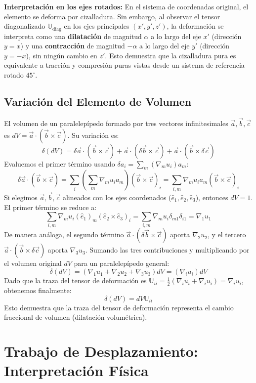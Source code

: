 \textbf{Interpretación en los ejes rotados:}
En el sistema de coordenadas original, el elemento se deforma por cizalladura. Sin embargo, al observar el tensor diagonalizado $\mathbb{U}_{\text{diag}}$ en los ejes principales $(x', y', z')$, la deformación se interpreta como una \textbf{dilatación} de magnitud $\alpha$ a lo largo del eje $x'$ (dirección $y=x$) y una \textbf{contracción} de magnitud $-\alpha$ a lo largo del eje $y'$ (dirección $y=-x$), sin ningún cambio en $z'$. Esto demuestra que la cizalladura pura es equivalente a tracción y compresión puras vistas desde un sistema de referencia rotado $45^\circ$.

\subsection{Variación del Elemento de Volumen}

El volumen de un paralelepípedo formado por tres vectores infinitesimales $\vec{a}, \vec{b}, \vec{c}$ es $dV = \vec{a} \cdot (\vec{b} \times \vec{c})$. Su variación es:
$$ \delta(dV) = \delta\vec{a} \cdot (\vec{b} \times \vec{c}) + \vec{a} \cdot (\delta\vec{b} \times \vec{c}) + \vec{a} \cdot (\vec{b} \times \delta\vec{c}) $$
Evaluemos el primer término usando $\delta a_i = \sum_m (\nabla_m u_i) a_m$:
$$ \delta\vec{a} \cdot (\vec{b} \times \vec{c}) = \sum_i \left( \sum_m \nabla_m u_i a_m \right) (\vec{b} \times \vec{c})_i = \sum_{i,m} \nabla_m u_i a_m (\vec{b} \times \vec{c})_i $$
Si elegimos $\vec{a}, \vec{b}, \vec{c}$ alineados con los ejes coordenados ($\hat{e}_1, \hat{e}_2, \hat{e}_3$), entonces $dV = 1$. El primer término se reduce a:
$$ \sum_{i,m} \nabla_m u_i (\hat{e}_1)_m (\hat{e}_2 \times \hat{e}_3)_i = \sum_{i,m} \nabla_m u_i \delta_{m1} \delta_{i1} = \nabla_1 u_1 $$
De manera análoga, el segundo término $\vec{a} \cdot (\delta\vec{b} \times \vec{c})$ aporta $\nabla_2 u_2$, y el tercero $\vec{a} \cdot (\vec{b} \times \delta\vec{c})$ aporta $\nabla_3 u_3$.
Sumando las tres contribuciones y multiplicando por el volumen original $dV$ para un paralelepípedo general:
$$ \delta(dV) = (\nabla_1 u_1 + \nabla_2 u_2 + \nabla_3 u_3) dV = (\nabla_i u_i) dV $$
Dado que la traza del tensor de deformación es $\mathbb{U}_{ii} = \frac{1}{2}(\nabla_i u_i + \nabla_i u_i) = \nabla_i u_i$, obtenemos finalmente:
$$ \delta(dV) = dV \mathbb{U}_{ii} $$
Esto demuestra que la traza del tensor de deformación representa el cambio fraccional de volumen (dilatación volumétrica).

\section{Trabajo de Desplazamiento: Interpretación Física}

